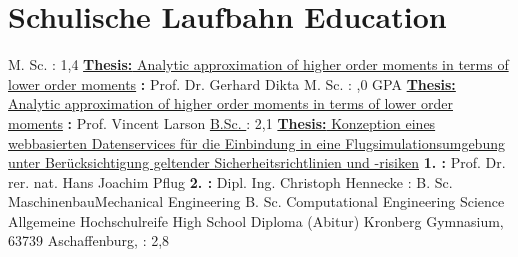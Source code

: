 \section{\ifgerman Schulische Laufbahn \else Education \fi}
    {M. Sc. \ami}
    {\newline{}\fhac}
    {\fhacloc}
    {\newline{}\grade: 1,4}
    {\href{https://github.com/svbergmann/Masterthesis/blob/master/out/Masterthesis.pdf}{\textbf{Thesis:} Analytic approximation of higher order moments in terms of lower order moments} \newline{} \textbf{\supervisor:} Prof. Dr. Gerhard Dikta}
    {M. Sc. \mathematics}
    {\newline{}\uwm}
    {\uwmloc}
    {\newline{}\grade: ,0 GPA\fi}
    {\href{https://github.com/svbergmann/Masterthesis/blob/master/out/Masterthesis.pdf}{\textbf{Thesis:} Analytic approximation of higher order moments in terms of lower order moments} \newline{} \textbf{\supervisor:} Prof. Vincent Larson}
    {\hyperlink{certificates/Bachelorzeugnis_compressed.pdf.1}{B.Sc. \ami}}
    {\newline{}\fhac}
    {\fhacloc}
    {\newline{}\grade: 2,1}
    {\href{https://github.com/svbergmann/Bachelorarbeit/tree/master/out}{\textbf{Thesis:} Konzeption eines webbasierten Datenservices für die Einbindung in eine Flugsimulationsumgebung unter Berücksichtigung geltender Sicherheitsrichtlinien und -risiken} \newline{} \textbf{1. \supervisor:} Prof. Dr. rer. nat. Hans Joachim Pflug \newline{}\textbf{2. \supervisor:} Dipl. Ing. Christoph Hennecke}
    {\hyperlink{certificates/IHKPruefungszeugnisCompressed.pdf.1}{\matse}}
    {\newline{}\cae}
    {\caeloc}
    {\newline{}\grade: \satisfactory}{}
    {B. Sc. \ifgerman Maschinenbau\else Mechanical Engineering\fi}
    {\newline{}\rwthac}
    {\rwthacloc}
    {\newline{}\withoutdegree}{}
    {B. Sc. Computational Engineering Science}
    {\newline{}\rwthac}
    {\rwthacloc}
    {\newline{}\withoutdegree}{}
    {\ifgerman Allgemeine Hochschulreife \else High School Diploma \fi (Abitur)}
    {\newline{}Kronberg Gymnasium, 63739 Aschaffenburg, \germany}{\grade: 2,8}{}{}